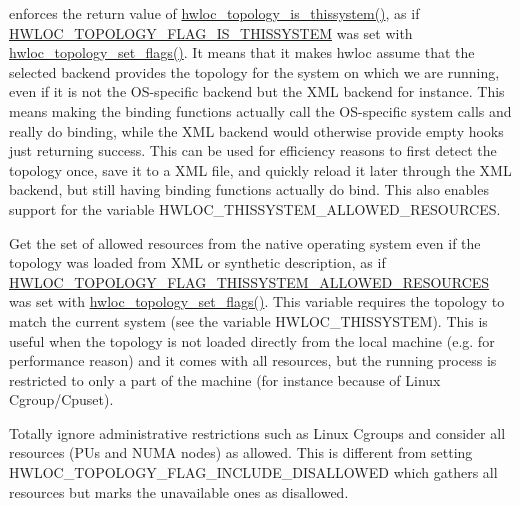 \begin{DoxyDescription}
\item[H\+W\+L\+O\+C\+\_\+\+T\+H\+I\+S\+S\+Y\+S\+T\+EM=1 ]enforces the return value of \hyperlink{a00193_ga68ffdcfd9175cdf40709801092f18017}{hwloc\+\_\+topology\+\_\+is\+\_\+thissystem()}, as if \hyperlink{a00193_ggada025d3ec20b4b420f8038d23d6e7bdea6ecb6abc6a0bb75e81564f8bca85783b}{H\+W\+L\+O\+C\+\_\+\+T\+O\+P\+O\+L\+O\+G\+Y\+\_\+\+F\+L\+A\+G\+\_\+\+I\+S\+\_\+\+T\+H\+I\+S\+S\+Y\+S\+T\+EM} was set with \hyperlink{a00193_gaaeed4df656979e5f16befea9d29b814b}{hwloc\+\_\+topology\+\_\+set\+\_\+flags()}. It means that it makes hwloc assume that the selected backend provides the topology for the system on which we are running, even if it is not the O\+S-\/specific backend but the X\+ML backend for instance. This means making the binding functions actually call the O\+S-\/specific system calls and really do binding, while the X\+ML backend would otherwise provide empty hooks just returning success. This can be used for efficiency reasons to first detect the topology once, save it to a X\+ML file, and quickly reload it later through the X\+ML backend, but still having binding functions actually do bind. This also enables support for the variable H\+W\+L\+O\+C\+\_\+\+T\+H\+I\+S\+S\+Y\+S\+T\+E\+M\+\_\+\+A\+L\+L\+O\+W\+E\+D\+\_\+\+R\+E\+S\+O\+U\+R\+C\+ES. 


\item[H\+W\+L\+O\+C\+\_\+\+T\+H\+I\+S\+S\+Y\+S\+T\+E\+M\+\_\+\+A\+L\+L\+O\+W\+E\+D\+\_\+\+R\+E\+S\+O\+U\+R\+C\+ES=1 ]Get the set of allowed resources from the native operating system even if the topology was loaded from X\+ML or synthetic description, as if \hyperlink{a00193_ggada025d3ec20b4b420f8038d23d6e7bdea1b66bbd66e900e5c837f71defb32ad89}{H\+W\+L\+O\+C\+\_\+\+T\+O\+P\+O\+L\+O\+G\+Y\+\_\+\+F\+L\+A\+G\+\_\+\+T\+H\+I\+S\+S\+Y\+S\+T\+E\+M\+\_\+\+A\+L\+L\+O\+W\+E\+D\+\_\+\+R\+E\+S\+O\+U\+R\+C\+ES} was set with \hyperlink{a00193_gaaeed4df656979e5f16befea9d29b814b}{hwloc\+\_\+topology\+\_\+set\+\_\+flags()}. This variable requires the topology to match the current system (see the variable H\+W\+L\+O\+C\+\_\+\+T\+H\+I\+S\+S\+Y\+S\+T\+EM). This is useful when the topology is not loaded directly from the local machine (e.\+g. for performance reason) and it comes with all resources, but the running process is restricted to only a part of the machine (for instance because of Linux Cgroup/\+Cpuset). 


\item[H\+W\+L\+O\+C\+\_\+\+A\+L\+L\+OW=all ]Totally ignore administrative restrictions such as Linux Cgroups and consider all resources (P\+Us and N\+U\+MA nodes) as allowed. This is different from setting H\+W\+L\+O\+C\+\_\+\+T\+O\+P\+O\+L\+O\+G\+Y\+\_\+\+F\+L\+A\+G\+\_\+\+I\+N\+C\+L\+U\+D\+E\+\_\+\+D\+I\+S\+A\+L\+L\+O\+W\+ED which gathers all resources but marks the unavailable ones as disallowed. 



\end{DoxyDescription}
